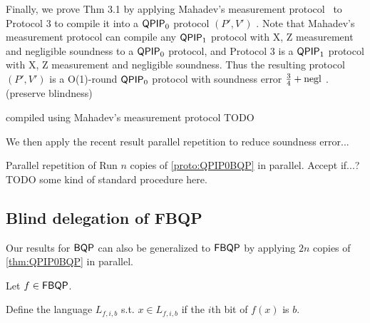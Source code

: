 
Finally, we prove Thm 3.1 by applying Mahadev's measurement protocol~\cite{mahadev_delegation} to Protocol 3 to compile it into a $\operatorname{\mathsf{QPIP}}_0$ protocol $(P', V')$ .
Note that Mahadev's measurement protocol can compile any $\operatorname{\mathsf{QPIP}}_1$ protocol with X, Z measurement and negligible soundness to a $\operatorname{\mathsf{QPIP}}_0$ protocol, and Protocol 3 is a $\operatorname{\mathsf{QPIP}}_1$ protocol with X, Z measurement and negligible soundness.
Thus the resulting protocol $(P', V')$ is a O(1)-round $\operatorname{\mathsf{QPIP}}_0$ protocol with soundness error $\frac{3}{4} + \operatorname{negl}$ . (preserve blindness)


\begin{protocol}{ compiled using Mahadev's measurement protocol}
	\label{proto:QPIP0BQP}
	TODO

\end{protocol}

We then apply the recent result parallel repetition to reduce soundness error...


\begin{protocol}{Parallel repetition of}
	\label{proto:repQPIP0BQP}
	Run $n$ copies of \cref{proto:QPIP0BQP} in parallel. Accept if...? TODO some kind of standard procedure here.

\end{protocol}

\subsection{Blind delegation of FBQP}


Our results for $\operatorname{\mathsf{BQP}}$ can also be generalized to $\operatorname{\mathsf{FBQP}}$ by applying $2n$ copies of \cref{thm:QPIP0BQP} in parallel.

Let $f\in\operatorname{\mathsf{FBQP}}$.

Define the language $L_{f, i, b}$ s.t. $x\in L_{f, i, b}$ if the $i$th bit of $f(x)$ is $b$.


